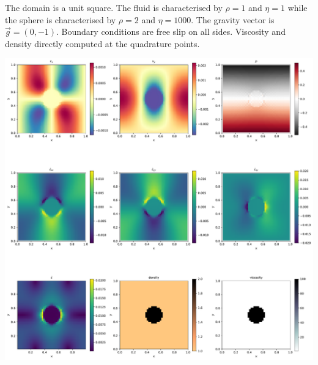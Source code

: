


The domain is a unit square. The fluid is characterised 
by $\rho=1$ and $\eta=1$ 
while the sphere is characterised 
by $\rho=2$ and $\eta=1000$.
The gravity vector is $\vec{g}=(0,-1)$. 
Boundary conditions are free slip on all sides.
Viscosity and density directly computed at the quadrature points.

\includegraphics[width=15cm]{python_codes/fieldstone_02/solution.pdf}

